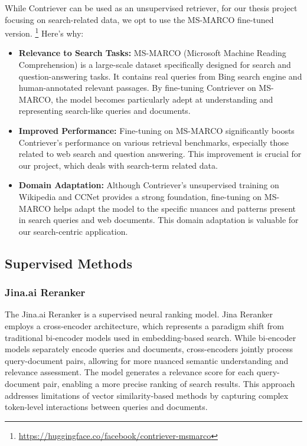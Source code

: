 While Contriever can be used as an unsupervised retriever, for our thesis project focusing on search-related data, we opt to use the MS-MARCO fine-tuned version. \footnote{\url{https://huggingface.co/facebook/contriever-msmarco}}
Here's why:
\begin{itemize}
    \item \textbf{Relevance to Search Tasks:} MS-MARCO (Microsoft Machine Reading Comprehension) is a large-scale dataset specifically designed for search and question-answering tasks. It contains real queries from Bing search engine and human-annotated relevant passages. By fine-tuning Contriever on MS-MARCO, the model becomes particularly adept at understanding and representing search-like queries and documents.
    \item \textbf{Improved Performance:} Fine-tuning on MS-MARCO significantly boosts Contriever's performance on various retrieval benchmarks, especially those related to web search and question answering. This improvement is crucial for our project, which deals with search-term related data.
    \item \textbf{Domain Adaptation:} Although Contriever's unsupervised training on Wikipedia and CCNet provides a strong foundation, fine-tuning on MS-MARCO helps adapt the model to the specific nuances and patterns present in search queries and web documents. This domain adaptation is valuable for our search-centric application.
\end{itemize}

\subsection{Supervised Methods}\label{subsec:supervised-methods}

\subsubsection{Jina.ai Reranker}
The Jina.ai Reranker is a supervised neural ranking model.
Jina Reranker employs a cross-encoder architecture, which represents a paradigm shift from traditional bi-encoder models used in embedding-based search.
While bi-encoder models separately encode queries and documents, cross-encoders jointly process query-document pairs, allowing for more nuanced semantic understanding and relevance assessment.
The model generates a relevance score for each query-document pair, enabling a more precise ranking of search results.
This approach addresses limitations of vector similarity-based methods by capturing complex token-level interactions between queries and documents.

